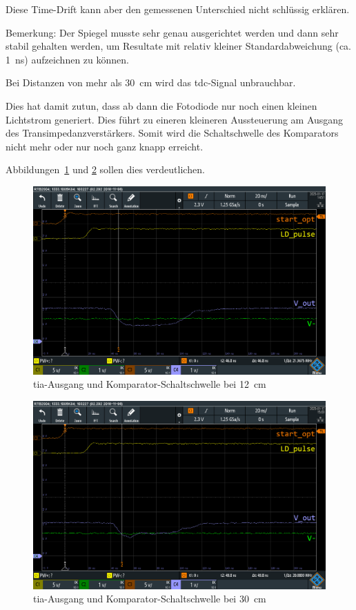 Diese Time-Drift kann aber den gemessenen Unterschied nicht schlüssig erklären.

Bemerkung: Der Spiegel musste sehr genau ausgerichtet werden und dann sehr stabil gehalten werden, um Resultate mit
relativ kleiner Standardabweichung (ca. 1~ns) aufzeichnen zu können.

Bei Distanzen von mehr als 30~cm wird das \acrshort{tdc}-Signal unbrauchbar.

Dies hat damit zutun, dass ab dann die Fotodiode nur noch einen kleinen Lichtstrom generiert. Dies führt zu eineren
kleineren Aussteuerung am Ausgang des Transimpedanzverstärkers. Somit wird die Schaltschwelle des Komparators nicht mehr
oder nur noch ganz knapp erreicht.

Abbildungen~\ref{fig:spiegel_12cm_dso_ok} und \ref{fig:spiegel_30cm_dso_nok} sollen dies verdeutlichen.

\begin{figure}[H]
    \centering
    \includegraphics[width=\textwidth]{graphics/spiegel_12cm_dso_ok.png}
    \caption{\acrshort{tia}-Ausgang und Komparator-Schaltschwelle bei 12~cm}\label{fig:spiegel_12cm_dso_ok}
\end{figure}

\begin{figure}[H]
    \centering
    \includegraphics[width=\textwidth]{graphics/spiegel_30cm_dso_nok.png}
    \caption{\acrshort{tia}-Ausgang und Komparator-Schaltschwelle bei 30~cm}\label{fig:spiegel_30cm_dso_nok}
\end{figure}

